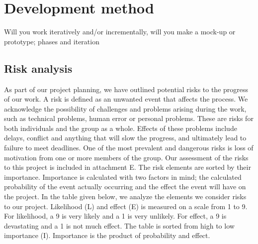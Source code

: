 \section{Development method}
Will you work iteratively and/or incrementally, will you make a 
mock-up or prototype; phases and iteration



\subsection{Risk analysis}
As part of our project planning, we have outlined potential risks to the progress of our work. A risk
is defined as an unwanted event that affects the process. We acknowledge the possibility of challenges and problems arising during the work, such as technical problems, human error or personal problems. These are risks for both individuals and the group as a whole. Effects of these problems include delays, conflict and anything that will slow the progress, and ultimately lead to failure to  meet deadlines. One of the most prevalent and dangerous risks is loss of motivation from one or more members of the group. Our assessment of the risks to this project is included in attachment E. The risk elements are sorted by their importance. Importance is calculated with two factors in mind; the calculated probability of the event actually occurring and the effect the event will have on the project. 
In the table given below, we analyze the elements we consider risks to our project. Likelihood (L) and effect (E) is measured on a scale from 1 to 9. For likelihood, a 9 is very likely and a 1 is very unlikely. For effect, a 9 is devastating and a 1 is not much effect. The table is sorted from high to low importance (I). Importance is the product of probability and effect. 




